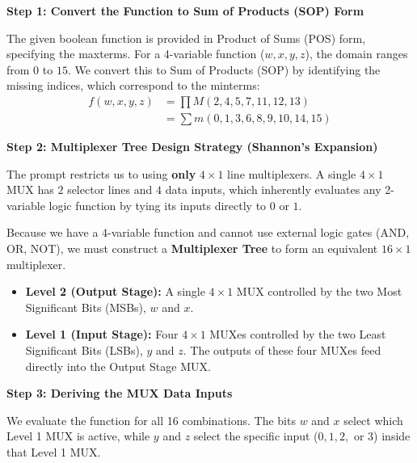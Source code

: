 \documentclass[12pt,a3paper]{article}
\begin{document}
\begin{enumerate}
\begin{tcolorbox}[enhanced,breakable,ansbox,colback=cD!4,colframe=cD,boxrule=0.8pt,arc=5pt,title={\textbf{Answer}},fonttitle=\bfseries\color{white},colbacktitle=cD]

\textbf{Step 1: Convert the Function to Sum of Products (SOP) Form}

The given boolean function is provided in Product of Sums (POS) form, specifying the maxterms. For a 4-variable function ($w, x, y, z$), the domain ranges from $0$ to $15$. We convert this to Sum of Products (SOP) by identifying the missing indices, which correspond to the minterms:
\begin{align*}
f(w,x,y,z) &= \prod M(2,4,5,7,11,12,13) \\
           &= \sum m(0,1,3,6,8,9,10,14,15)
\end{align*}

\textbf{Step 2: Multiplexer Tree Design Strategy (Shannon's Expansion)}

The prompt restricts us to using \textbf{only} $4\times1$ line multiplexers. A single $4\times1$ MUX has $2$ selector lines and $4$ data inputs, which inherently evaluates any 2-variable logic function by tying its inputs directly to $0$ or $1$. 

Because we have a 4-variable function and cannot use external logic gates (AND, OR, NOT), we must construct a \textbf{Multiplexer Tree} to form an equivalent $16\times1$ multiplexer. 
\begin{itemize}
    \item \textbf{Level 2 (Output Stage):} A single $4\times1$ MUX controlled by the two Most Significant Bits (MSBs), $w$ and $x$.
    \item \textbf{Level 1 (Input Stage):} Four $4\times1$ MUXes controlled by the two Least Significant Bits (LSBs), $y$ and $z$. The outputs of these four MUXes feed directly into the Output Stage MUX.
\end{itemize}

\textbf{Step 3: Deriving the MUX Data Inputs}

We evaluate the function for all 16 combinations. The bits $w$ and $x$ select which Level 1 MUX is active, while $y$ and $z$ select the specific input ($0, 1, 2,$ or $3$) inside that Level 1 MUX.


\end{tcolorbox}
\end{enumerate}
\end{document}
